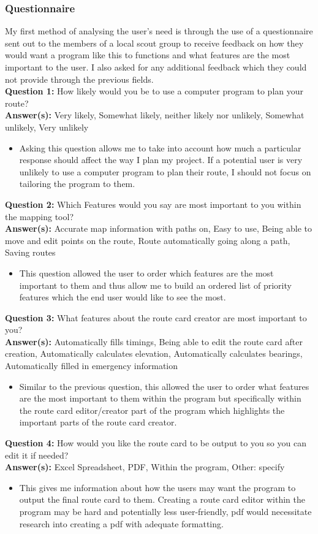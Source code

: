 \documentclass{article}
\newcommand{\QAnalysis}[4]{
    \noindent \textbf{Question #1: } #2 \\
    \noindent \textbf{Answer(s): } #3
    \begin{itemize}
        \item #4
    \end{itemize}
}
\begin{document}
        \subsubsection{Questionnaire}

            My first method of analysing the user's need is through the use of a questionnaire sent out to the members of a local scout group to receive feedback on how they would want a program like this to functions and what features are the most important to the user. I also asked for any additional feedback which they could not provide through the previous fields. \\
            
            \QAnalysis{1}{How likely would you be to use a computer program to plan your route?}{Very likely, Somewhat likely, neither likely nor unlikely, Somewhat unlikely, Very unlikely}{Asking this question allows me to take into account how much a particular response should affect the way I plan my project. If a potential user is very unlikely to use a computer program to plan their route, I should not focus on tailoring the program to them.}

            \QAnalysis{2}{Which Features would you say are most important to you within the mapping tool?}{Accurate map information with paths on, Easy to use, Being able to move and edit points on the route, Route automatically going along a path, Saving routes}{This question allowed the user to order which features are the most important to them and thus allow me to build an ordered list of priority features which the end user would like to see the most.}

            \QAnalysis{3}{What features about the route card creator are most important to you?}{Automatically fills timings, Being able to edit the route card after creation, Automatically calculates elevation, Automatically calculates bearings, Automatically filled in emergency information}{Similar to the previous question, this allowed the user to order what features are the most important to them within the program but specifically within the route card editor/creator part of the program which highlights the important parts of the route card creator.}

            \QAnalysis{4}{How would you like the route card to be output to you so you can edit it if needed?}{Excel Spreadsheet, PDF, Within the program, Other: specify}{This gives me information about how the users may want the program to output the final route card to them. Creating a route card editor within the program may be hard and potentially less user-friendly, pdf would necessitate research into creating a pdf with adequate formatting.}
\end{document}
